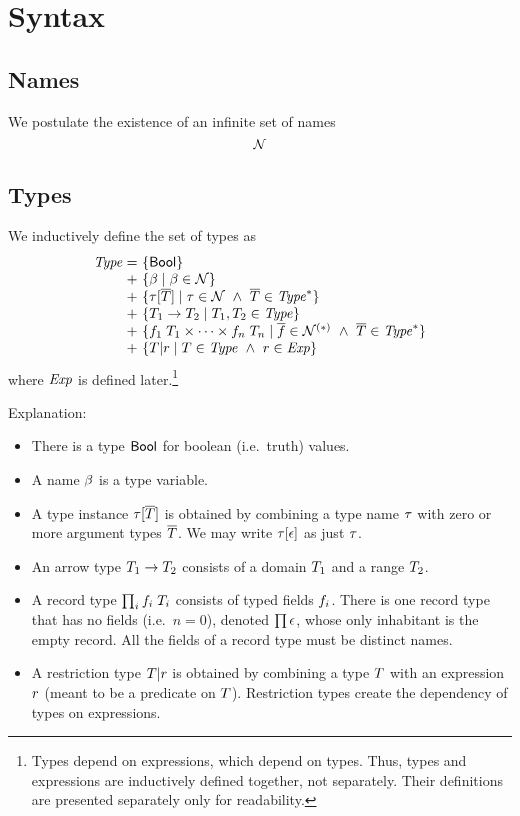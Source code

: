\section{Syntax}
\label{syntax}

\subsection{Names}

We postulate the existence of an infinite set of names
\[
\mathcal{N}
\]

\subsection{Types}

We inductively define the set of types as
\[
\setdefVI
 {\Typ}
 {+}
 {\setI{\bool}}
 {\setST{\tvar}{\tvar\in\Nam}}
 {\setST{\tinstO}{\tnam\in\Nam\AND\typS\in\Seq{\Typ}}}
 {\setST{\tarr{\typ_1}{\typ_2}}{\typ_1,\typ_2\in\Typ}}
 {\setST{\trecFTO}{\fnamS\in\SeqNR{\Nam}\AND\typS\in\Seq{\Typ}}}
 {\setST{\tsubO}{\typ\in\Typ\AND\tspred\in\Expr}}
\]
where $\mathit{Exp}$ is defined later.\footnote{Types depend on expressions, which
depend on types. Thus, types and expressions are inductively defined together,
not separately. Their definitions are presented separately only for
readability.}

Explanation:
\begin{itemize}
\item
There is a type $\mathsf{Bool}$ for boolean (i.e.\ truth) values.
\item
A name $\beta$ is a type variable.
\item
A type instance $\tau[\overline{T}]$ is obtained by combining a type name $\tau$ with
zero or more argument types $\overline{T}$. We may write $\tau[\epsilon]$ as
just $\tau$.
\item
An arrow type $T_1\to T_2$ consists of a domain $T_1$ and a range $T_2$.
\item
A record type $\prod_{i}f_i\;T_i$ consists of typed fields $f_i$. There is one record
type that has no fields (i.e.\ $n=0$), denoted $\prod\epsilon$, whose only
inhabitant is the empty record. All the fields of a record type must be
distinct names.
\item
A restriction type $T|r$ is obtained by combining a type $T$ with an
expression $r$ (meant to be a predicate on $T$). Restriction types
create the dependency of types on expressions.
\end{itemize}

